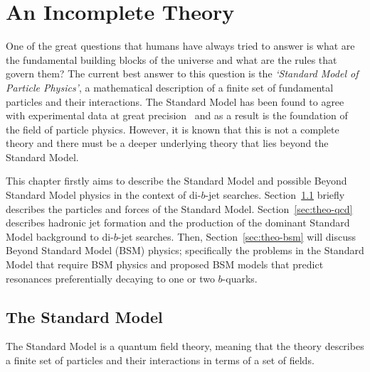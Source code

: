 \chapter{An Incomplete Theory}
\label{sec:theo}

One of the great questions that humans have always tried to answer is
what are the fundamental building blocks of the universe and what are the rules that govern them?
%
The current best answer to this question is the \textit{`Standard Model of Particle Physics'},
a mathematical description of a finite set of fundamental particles and their interactions.
The Standard Model has been found to agree with experimental data at great precision~\cite{theo-ewTests}
and as a result is the foundation of the field of particle physics.
However, it is known that this is not a complete theory and there must be
a deeper underlying theory that lies beyond the Standard Model.

This chapter firstly aims to describe the Standard Model and
possible Beyond Standard Model physics in the context of di-$b$-jet searches.
Section~\ref{sec:theo-sm} briefly describes the particles and forces of the Standard Model.
Section~\ref{sec:theo-qcd} describes hadronic jet formation and the production of the dominant Standard Model background to di-$b$-jet searches.
Then, Section~\ref{sec:theo-bsm} will discuss Beyond Standard Model (BSM) physics;
specifically the problems in the Standard Model that require BSM physics
and proposed BSM models that predict resonances preferentially decaying to one or two $b$-quarks.

\section{The Standard Model}
\label{sec:theo-sm}

The Standard Model is a quantum field theory,
meaning that the theory describes a finite set of particles and their interactions in
terms of a set of fields.


